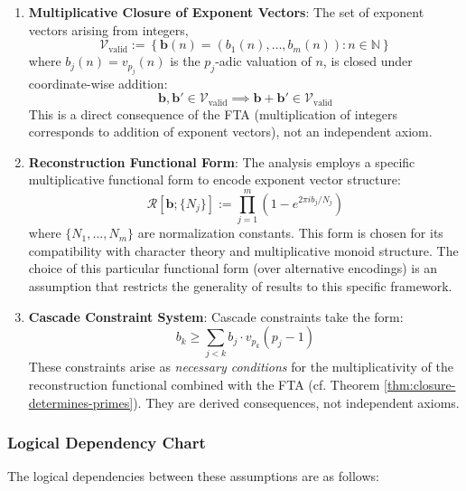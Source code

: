 \begin{enumerate}
\item \textbf{Multiplicative Closure of Exponent Vectors}: The set of exponent vectors arising from integers,
\begin{equation}
\mathcal{V}_{\text{valid}} := \left\{\mathbf{b}(n) = (b_1(n), \ldots, b_m(n)) : n \in \mathbb{N}\right\}
\end{equation}
where $b_j(n) = v_{p_j}(n)$ is the $p_j$-adic valuation of $n$, is closed under coordinate-wise addition:
\begin{equation}
\mathbf{b}, \mathbf{b}' \in \mathcal{V}_{\text{valid}} \implies \mathbf{b} + \mathbf{b}' \in \mathcal{V}_{\text{valid}}
\end{equation}
This is a direct consequence of the FTA (multiplication of integers corresponds to addition of exponent vectors), not an independent axiom.

\item \textbf{Reconstruction Functional Form}: The analysis employs a specific multiplicative functional form to encode exponent vector structure:
\begin{equation}
\mathcal{R}[\mathbf{b}; \{N_j\}] := \prod_{j=1}^m \left(1 - e^{2\pi i b_j / N_j}\right)
\end{equation}
where $\{N_1, \ldots, N_m\}$ are normalization constants. This form is chosen for its compatibility with character theory and multiplicative monoid structure. The choice of this particular functional form (over alternative encodings) is an assumption that restricts the generality of results to this specific framework.

\item \textbf{Cascade Constraint System}: Cascade constraints take the form:
\begin{equation}
b_k \geq \sum_{j < k} b_j \cdot v_{p_k}(p_j - 1)
\end{equation}
These constraints arise as \textit{necessary conditions} for the multiplicativity of the reconstruction functional combined with the FTA (cf. Theorem \ref{thm:closure-determines-primes}). They are derived consequences, not independent axioms.

\end{enumerate}

\subsubsection{Logical Dependency Chart}
\label{subsubsec:dependency-chart}

The logical dependencies between these assumptions are as follows:

